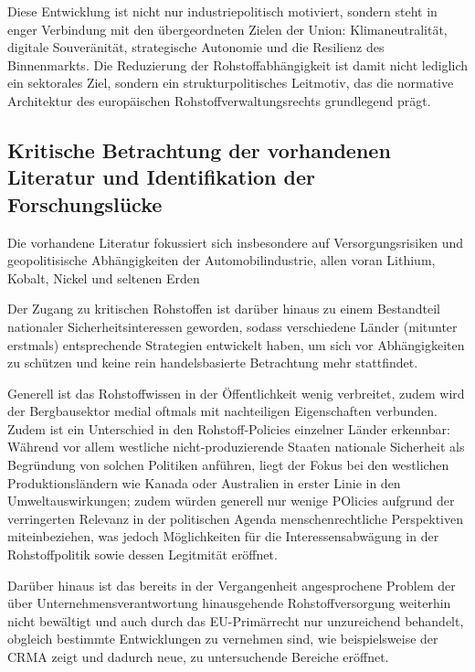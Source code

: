\documentclass[12pt,a4paper,oneside]{book} %
\begin{document}
Diese Entwicklung ist nicht nur industriepolitisch motiviert, sondern steht in enger Verbindung mit den übergeordneten Zielen der Union: Klimaneutralität, digitale Souveränität, strategische Autonomie und die Resilienz des Binnenmarkts. Die Reduzierung der Rohstoffabhängigkeit ist damit nicht lediglich ein sektorales Ziel, sondern ein strukturpolitisches Leitmotiv, das die normative Architektur des europäischen Rohstoffverwaltungsrechts grundlegend prägt.

\subsection{Kritische Betrachtung der vorhandenen Literatur und Identifikation der Forschungslücke}

Die vorhandene Literatur fokussiert sich insbesondere auf Versorgungsrisiken und geopolitisische Abhängigkeiten der Automobilindustrie, allen voran Lithium, Kobalt, Nickel und seltenen Erden  

Der Zugang zu kritischen Rohstoffen ist darüber hinaus zu einem Bestandteil nationaler Sicherheitsinteressen geworden, sodass verschiedene Länder (mitunter erstmals) entsprechende Strategien entwickelt haben, um sich vor Abhängigkeiten zu schützen und keine rein handelsbasierte Betrachtung mehr stattfindet.\autocite{Mistra Mineral Governance Report 2024-2025, S. 10}

Generell ist das Rohstoffwissen in der Öffentlichkeit wenig verbreitet, zudem wird der Bergbausektor medial oftmals mit nachteiligen Eigenschaften verbunden.\autocite{Frenz 2025, S. 94} Zudem ist ein Unterschied in den Rohstoff-Policies einzelner Länder erkennbar: Während vor allem westliche nicht-produzierende Staaten nationale Sicherheit als Begründung von solchen Politiken anführen, liegt der Fokus bei den westlichen Produktionsländern wie Kanada oder Australien in erster Linie in den Umweltauswirkungen; zudem würden generell nur wenige POlicies aufgrund der verringerten Relevanz in der politischen Agenda menschenrechtliche Perspektiven miteinbeziehen, was jedoch Möglichkeiten für die Interessensabwägung in der Rohstoffpolitik sowie dessen Legitmität eröffnet.\autocite{Mistra Mineral Governance Report 2024-2025, S. 14} 

Darüber hinaus ist das bereits in der Vergangenheit angesprochene Problem der über Unternehmensverantwortung hinausgehende Rohstoffversorgung weiterhin nicht bewältigt und auch durch das EU-Primärrecht nur unzureichend behandelt,\autocites{Rechtsfragen des intl Rohstoffhandels}{Stober Korte, Rm 540} obgleich bestimmte Entwicklungen zu vernehmen sind, wie beispielsweise der CRMA zeigt und dadurch neue, zu untersuchende Bereiche eröffnet.
\end{document}
